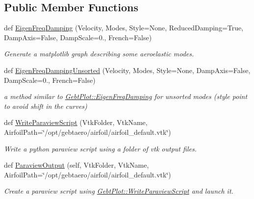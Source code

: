 \subsection*{Public Member Functions}
\begin{DoxyCompactItemize}
\item 
def \hyperlink{classgebtaero_1_1_gebt_plot_1_1_gebt_plot_a487ebf0a378a8417070b0e69f73e1970}{Eigen\+Freq\+Damping} (Velocity, Modes, Style=None, Reduced\+Damping=True, Damp\+Axis=False, Damp\+Scale=0., French=False)
\begin{DoxyCompactList}\small\item\em Generate a matplotlib graph describing some aeroelastic modes. \end{DoxyCompactList}\item 
def \hyperlink{classgebtaero_1_1_gebt_plot_1_1_gebt_plot_ada6addc1b62b7ee88fa482a6a2c7abd1}{Eigen\+Freq\+Damping\+Unsorted} (Velocity, Modes, Style=None, Damp\+Axis=False, Damp\+Scale=0., French=False)
\begin{DoxyCompactList}\small\item\em a method similar to \hyperlink{classgebtaero_1_1_gebt_plot_1_1_gebt_plot_a487ebf0a378a8417070b0e69f73e1970}{Gebt\+Plot\+::\+Eigen\+Freq\+Damping} for unsorted modes (style point to avoid shift in the curves) \end{DoxyCompactList}\item 
def \hyperlink{classgebtaero_1_1_gebt_plot_1_1_gebt_plot_aada9da700e97eef6c59a4377098954af}{Write\+Paraview\+Script} (Vtk\+Folder, Vtk\+Name, Airfoil\+Path=\char`\"{}/opt/gebtaero/airfoil/airfoil\+\_\+default.\+vtk\char`\"{})
\begin{DoxyCompactList}\small\item\em Write a python paraview script using a folder of vtk output files. \end{DoxyCompactList}\item 
def \hyperlink{classgebtaero_1_1_gebt_plot_1_1_gebt_plot_ae78de8134989ce474d9a7d32b6f7e7c9}{Paraview\+Output} (self, Vtk\+Folder, Vtk\+Name, Airfoil\+Path=\char`\"{}/opt/gebtaero/airfoil/airfoil\+\_\+default.\+vtk\char`\"{})
\begin{DoxyCompactList}\small\item\em Create a paraview script using \hyperlink{classgebtaero_1_1_gebt_plot_1_1_gebt_plot_aada9da700e97eef6c59a4377098954af}{Gebt\+Plot\+::\+Write\+Paraview\+Script} and launch it. \end{DoxyCompactList}\end{DoxyCompactItemize}


